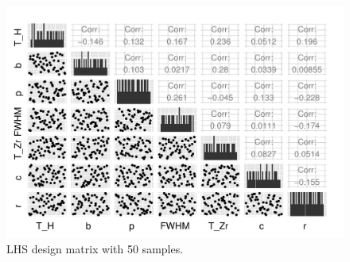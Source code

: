 \documentclass[review]{elsarticle}
\begin{document}
\begin{figure}[ht!]
	\begin{center}
		\includegraphics[width=1.\textwidth]{NSE15-48R1_Figure4.pdf}
		\caption[]{\label{lhsmatrix}LHS design matrix with 50 samples.}%
	\end{center}
\end{figure}

\end{document}
